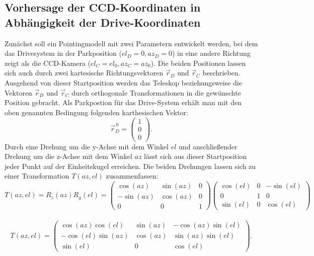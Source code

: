 \subsection{Vorhersage der CCD-Koordinaten in Abhängigkeit der Drive-Koordinaten}
Zunächst soll ein Pointingmodell mit zwei Parametern entwickelt werden, bei dem das Drivesystem in der Parkposition ($el_D=0,az_D=0$) in eine andere Richtung zeigt als die CCD-Kamera ($el_C=el_0,az_C=az_0$). Die beiden Positionen lassen sich auch durch zwei kartesische Richtungsvektoren $\vec{r}_D$ und $\vec{r}_C$ beschrieben. Ausgehend von dieser Startposition werden das Teleskop beziehungsweise die Vektoren $\vec{r}_D$ und $\vec{r}_C$ durch orthogonale Transformationen in die gewünschte Position gebracht. Als Parkpostion für das Drive-System erhält man mit den oben genannten Bedingung folgenden karthesischen Vektor:
\begin{equation}
\vec{r}_D^{\,0}=\left(\begin{array}{c} 1 \\ 0 \\ 0 \end{array}\right).
\label{eq:startDrive}
\end{equation}
Durch eine Drehung um die y-Achse mit dem Winkel $el$ und anschließender Drehung um die z-Achse mit dem Winkel $az$ lässt sich aus dieser Startposition jeder Punkt auf der Einheitskugel erreichen. Die beiden Drehungen lassen sich zu einer Transformation $T(az,el)$ zusammenfassen:
\begin{equation}
T(az,el)=R_z(az)R_y(el)=
\left(\begin{array}{ccc} \cos(az) & \sin(az) & 0 \\ -\sin(az) & \cos(az) & 0 \\ 0 & 0 & 1\end{array}\right)
\left(\begin{array}{ccc} \cos(el) & 0 &-\sin(el) \\0 & 1 & 0\\ \sin(el) & 0 & \cos(el) \end{array} \right)
\end{equation}\\
\begin{equation}
T(az,el)=\left(\begin{array}{ccc} \cos(az)\cos(el) & \sin(az) &-\cos(az)\sin(el) \\-\cos(el)\sin(az) & \cos(az) & \sin(az)\sin(el)\\ \sin(el) & 0 & \cos(el) \end{array} \right).
\label{eq:TransformMat}
\end{equation}\\
